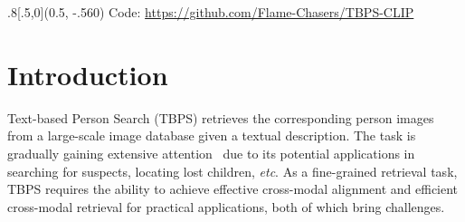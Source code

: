 \documentclass[letterpaper]{article} %
\begin{document}
\begin{abstract}
\end{abstract}

\begin{textblock*}{.8\textwidth}[.5,0](0.5\textwidth, -.560\textwidth)
\centering
{\small Code: \url{https://github.com/Flame-Chasers/TBPS-CLIP}}
\end{textblock*}

\section{Introduction}

Text-based Person Search (TBPS) retrieves the corresponding person images from a large-scale image database given a textual description. 
The task is gradually gaining extensive attention~\cite{jiang2023cross,bai2023rasa} due to its potential applications in searching for suspects, locating lost children, \emph{etc}. 
As a fine-grained retrieval task, TBPS requires the ability to achieve effective cross-modal alignment and efficient cross-modal retrieval for practical applications, both of which bring challenges.
\end{document}
